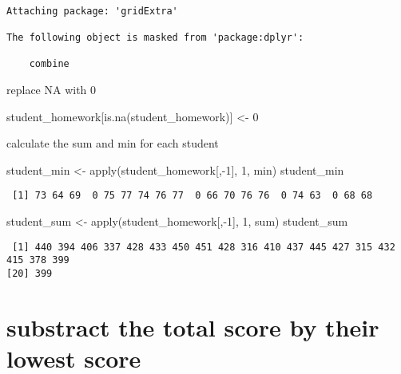\documentclass[
  letterpaper,
  DIV=11,
  numbers=noendperiod]{scrartcl}
\newenvironment{Shaded}{\begin{snugshade}}{\end{snugshade}}
\newcommand{\DecValTok}[1]{\textcolor[rgb]{0.68,0.00,0.00}{#1}}
\newcommand{\FunctionTok}[1]{\textcolor[rgb]{0.28,0.35,0.67}{#1}}
\newcommand{\NormalTok}[1]{\textcolor[rgb]{0.00,0.23,0.31}{#1}}
\newcommand{\OtherTok}[1]{\textcolor[rgb]{0.00,0.23,0.31}{#1}}
\newcommand{\SpecialCharTok}[1]{\textcolor[rgb]{0.37,0.37,0.37}{#1}}
\begin{document}
\begin{verbatim}

Attaching package: 'gridExtra'

The following object is masked from 'package:dplyr':

    combine
\end{verbatim}

replace NA with 0

\begin{Shaded}
\begin{Highlighting}[]
\NormalTok{student\_homework[}\FunctionTok{is.na}\NormalTok{(student\_homework)] }\OtherTok{\textless{}{-}} \DecValTok{0}
\end{Highlighting}
\end{Shaded}

calculate the sum and min for each student

\begin{Shaded}
\begin{Highlighting}[]
\NormalTok{student\_min }\OtherTok{\textless{}{-}} \FunctionTok{apply}\NormalTok{(student\_homework[,}\SpecialCharTok{{-}}\DecValTok{1}\NormalTok{], }\DecValTok{1}\NormalTok{, min)}
\NormalTok{student\_min}
\end{Highlighting}
\end{Shaded}

\begin{verbatim}
 [1] 73 64 69  0 75 77 74 76 77  0 66 70 76 76  0 74 63  0 68 68
\end{verbatim}

\begin{Shaded}
\begin{Highlighting}[]
\NormalTok{student\_sum }\OtherTok{\textless{}{-}} \FunctionTok{apply}\NormalTok{(student\_homework[,}\SpecialCharTok{{-}}\DecValTok{1}\NormalTok{], }\DecValTok{1}\NormalTok{, sum)}
\NormalTok{student\_sum}
\end{Highlighting}
\end{Shaded}

\begin{verbatim}
 [1] 440 394 406 337 428 433 450 451 428 316 410 437 445 427 315 432 415 378 399
[20] 399
\end{verbatim}

\hypertarget{substract-the-total-score-by-their-lowest-score}{%
\section{substract the total score by their lowest
score}\label{substract-the-total-score-by-their-lowest-score}}
\end{document}
